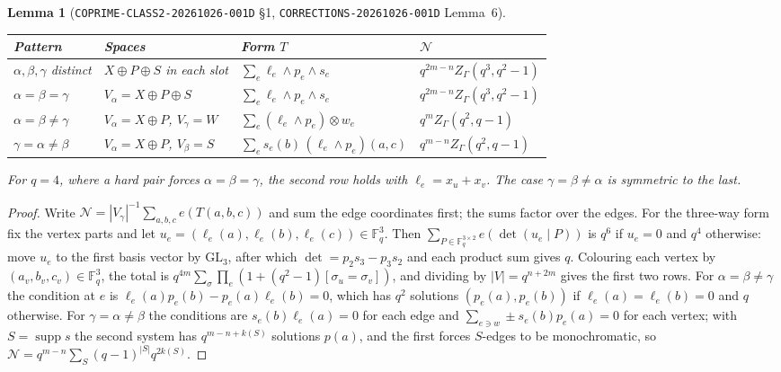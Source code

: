 \documentclass[11pt]{article}
\newtheorem{lemma}[theorem]{Lemma}
\theoremstyle{definition}
\theoremstyle{remark}
\newcommand{\F}{\mathbb{F}}
\newcommand{\cN}{\mathcal{N}}
\begin{document}
\begin{lemma}[\texttt{COPRIME-CLASS2-20261026-001D} \S1, \texttt{CORRECTIONS-20261026-001D} Lemma~6]\label{lem:gadget}
\begin{center}
\begin{tabular}{@{}llll@{}}
\toprule
Pattern & Spaces & Form $T$ & $\cN$\\
\midrule
$\alpha,\beta,\gamma$ distinct & $X\oplus P\oplus S$ in each slot & $\sum_e\ell_e\wedge p_e\wedge s_e$ & $q^{2m-n}Z_\Gamma(q^3,q^2-1)$\\
$\alpha=\beta=\gamma$ & $V_\alpha=X\oplus P\oplus S$ & $\sum_e\ell_e\wedge p_e\wedge s_e$ & $q^{2m-n}Z_\Gamma(q^3,q^2-1)$\\
$\alpha=\beta\ne\gamma$ & $V_\alpha=X\oplus P$, $V_\gamma=W$ & $\sum_e(\ell_e\wedge p_e)\otimes w_e$ & $q^{m}Z_\Gamma(q^2,q-1)$\\
$\gamma=\alpha\ne\beta$ & $V_\alpha=X\oplus P$, $V_\beta=S$ & $\sum_e s_e(b)\,(\ell_e\wedge p_e)(a,c)$ & $q^{m-n}Z_\Gamma(q^2,q-1)$\\
\bottomrule
\end{tabular}
\end{center}
For $q=4$, where a hard pair forces $\alpha=\beta=\gamma$, the second row holds
with $\ell_e=x_u+x_v$. The case $\gamma=\beta\ne\alpha$ is symmetric to the
last.
\end{lemma}

\begin{proof}
Write $\cN=|V_\gamma|^{-1}\sum_{a,b,c}e(T(a,b,c))$ and sum the edge coordinates
first; the sums factor over the edges. For the three-way form fix the vertex
parts and let $u_e=(\ell_e(a),\ell_e(b),\ell_e(c))\in\F_q^3$. Then
$\sum_{P\in\F_q^{3\times2}}e(\det(u_e\mid P))$ is $q^6$ if $u_e=0$ and $q^4$
otherwise: move $u_e$ to the first basis vector by $\mathrm{GL}_3$, after which
$\det=p_2s_3-p_3s_2$ and each product sum gives $q$. Colouring each vertex by
$(a_v,b_v,c_v)\in\F_q^3$, the total is
$q^{4m}\sum_\sigma\prod_e(1+(q^2-1)[\sigma_u=\sigma_v])$, and dividing by
$|V|=q^{n+2m}$ gives the first two rows. For $\alpha=\beta\ne\gamma$ the
condition at $e$ is $\ell_e(a)p_e(b)-p_e(a)\ell_e(b)=0$, which has $q^2$
solutions $(p_e(a),p_e(b))$ if $\ell_e(a)=\ell_e(b)=0$ and $q$ otherwise. For
$\gamma=\alpha\ne\beta$ the conditions are $s_e(b)\ell_e(a)=0$ for each edge
and $\sum_{e\ni w}\pm s_e(b)p_e(a)=0$ for each vertex; with $S=\operatorname{supp}s$
the second system has $q^{m-n+k(S)}$ solutions $p(a)$, and the first forces
$S$-edges to be monochromatic, so $\cN=q^{m-n}\sum_{S}(q-1)^{|S|}q^{2k(S)}$.
\end{proof}
\end{document}
